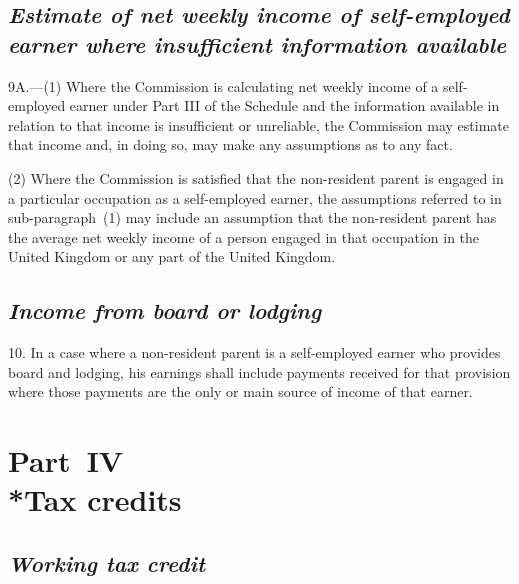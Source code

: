 \documentclass[12pt,a4paper]{article}
\begin{document}

\subsection*{\sloppy\itshape Estimate of net weekly income of self-\hspace{0pt}employed earner where insufficient information available}

9A.---(1)  Where the Commission is calculating net weekly income of a self-employed earner under Part III of the Schedule and the information available in relation to that income is insufficient or unreliable, the Commission may estimate that income and, in doing so, may make any assumptions as to any fact.

(2) Where the Commission is satisfied that the non-resident parent is engaged in a particular occupation as a self-employed earner, the assumptions referred to in sub-paragraph~(1) may include an assumption that the non-resident parent has the average net weekly income of a person engaged in that occupation in the United Kingdom or any part of the United Kingdom.


\subsection*{\itshape Income from board or lodging}

10.  In a case where a non-resident parent is a self-employed earner who provides board and lodging, his earnings shall include payments received for that provision where those payments are the only or main source of income of that earner.

\section[Part~IV --- Tax credits]{Part~IV\\*Tax credits}

\renewcommand\parthead{--- Schedule~Part~IV}

\subsection*{\itshape 
Working tax credit  %
}
\end{document}
